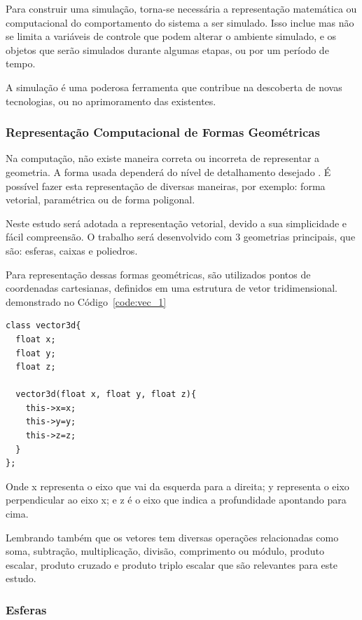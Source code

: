 Para construir uma simulação, torna-se necessária a representação matemática ou
computacional do comportamento do sistema a ser simulado. Isso inclue mas não
se limita a variáveis de controle que podem alterar o ambiente simulado, e os
objetos que serão simulados durante algumas etapas, ou por um período de tempo.

A simulação é uma poderosa ferramenta que contribue na descoberta de novas
tecnologias, ou no aprimoramento das existentes.


\subsubsection{Representação Computacional de Formas Geométricas}
Na computação, não existe maneira correta ou incorreta de representar a geometria. A forma usada dependerá do nível de detalhamento desejado . É possível fazer esta representação de diversas maneiras, por exemplo: forma vetorial, paramétrica ou de forma poligonal.

Neste estudo será adotada a representação vetorial, devido a sua simplicidade e fácil compreensão. O trabalho será desenvolvido com 3 geometrias principais, que são: esferas, caixas e poliedros.

Para representação dessas formas geométricas, são utilizados pontos de coordenadas cartesianas, definidos em uma estrutura de vetor tridimensional. demonstrado no Código~\ref{code:vec_1}

\begin{lstlisting}[frame=single,caption=Exemplo de vetor 3d\label{code:vec_1}]
class vector3d{
  float x;
  float y;
  float z;

  vector3d(float x, float y, float z){
    this->x=x;
    this->y=y;
    this->z=z;
  }
};
\end{lstlisting}

Onde x representa o eixo que vai da esquerda para a direita;
y representa o eixo  perpendicular ao eixo x;
e z é o eixo que indica a profundidade apontando para cima.


Lembrando também que os vetores tem diversas operações relacionadas como soma,
subtração, multiplicação, divisão, comprimento ou módulo, produto escalar,
produto cruzado e produto triplo escalar que são relevantes para este estudo.

\subsubsection{Esferas}

